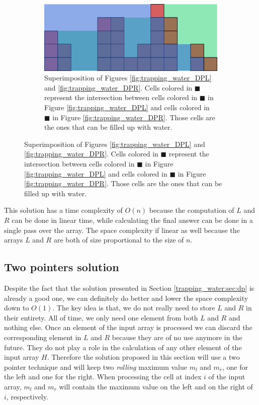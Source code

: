 \begin{figure}
\begin{subfigure}[b]{0.95\textwidth}
   \includegraphics[width=1\linewidth]{sources/trapping_water/images/DPLR}
   \caption{Superimposition of Figures \ref{fig:trapping_water_DPL} and \ref{fig:trapping_water_DPR}. Cells colored in \textcolor[HTML]{5aa1c7}{$\blacksquare$} represent the intersection between cells colored in \textcolor[HTML]{3268d5}{$\blacksquare$} in Figure \ref{fig:trapping_water_DPL} and cells colored in \textcolor[HTML]{32d579}{$\blacksquare$} in Figure \ref{fig:trapping_water_DPR}. Those cells are the ones that can be filled up with water.}
   \label{fig:trapping_water_DPRL}
\end{subfigure}

\end{figure}




This solution has a time complexity of $O(n)$ because the computation of $L$ and $R$ can be done in linear time, while calculating the final answer can be done in a single pass over the array. The space complexity if linear as well because the arrays $L$ and $R$ are both of size proportional to the size of $n$.


\subsection{Two pointers solution}
\label{trapping_water:sec:two_pointers}
Despite the fact that the solution presented in Section \ref{trapping_water:sec:dp} is already a good one, we can definitely do better and lower the space complexity down to $O(1)$. The key idea is that, we do not really need to store $L$ and $R$ in their entirety. All of time, we only need one element from both $L$ and $R$ and nothing else. Once an element of the input array is processed we can discard the corresponding element in $L$ and $R$ because they are of no use anymore in the future. They do not play a role in the calculation of any other element of the input array $H$. Therefore the solution proposed in this section will use a two pointer technique and will keep two \textit{rolling} maximum value $m_l$ and $m_r$, one for the left and one for the right. When processing the cell at index $i$ of the input array, $m_l$ and $m_r$ will contain the maximum value on the left  and on the right of $i$, respectively.

